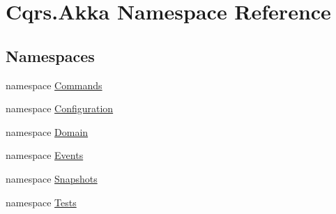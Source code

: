 \hypertarget{namespaceCqrs_1_1Akka}{}\section{Cqrs.\+Akka Namespace Reference}
\label{namespaceCqrs_1_1Akka}
\subsection*{Namespaces}
\begin{DoxyCompactItemize}
\item 
namespace \hyperlink{namespaceCqrs_1_1Akka_1_1Commands}{Commands}
\item 
namespace \hyperlink{namespaceCqrs_1_1Akka_1_1Configuration}{Configuration}
\item 
namespace \hyperlink{namespaceCqrs_1_1Akka_1_1Domain}{Domain}
\item 
namespace \hyperlink{namespaceCqrs_1_1Akka_1_1Events}{Events}
\item 
namespace \hyperlink{namespaceCqrs_1_1Akka_1_1Snapshots}{Snapshots}
\item 
namespace \hyperlink{namespaceCqrs_1_1Akka_1_1Tests}{Tests}
\end{DoxyCompactItemize}
